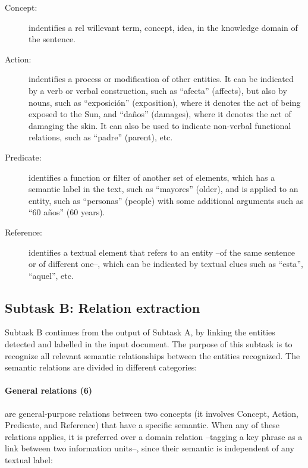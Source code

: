 \documentclass[a4paper,11pt,twocolumn,twoside]{article}
\begin{document}
\begin{description}
  \item[Concept:] indentifies a rel willevant term, concept, idea, in the knowledge domain of the sentence.
  \item[Action:] indentifies a process or modification of other entities. It can be indicated by a verb or verbal construction, such as “afecta” (affects), but also by nouns, such as “exposición” (exposition), where it denotes the act of being exposed to the Sun, and “daños” (damages), where it denotes the act of damaging the skin. It can also be used to indicate non-verbal functional relations, such as “padre” (parent), etc.
  \item[Predicate:] identifies a function or filter of another set of elements, which has a semantic label in the text, such as “mayores” (older), and is applied to an entity, such as “personas” (people) with some additional arguments such as “60 años” (60 years).
  \item[Reference:] identifies a textual element that refers to an entity –of the same sentence or of different one–, which can be indicated by textual clues such as “esta”, “aquel”, etc.
\end{description}

\subsection{Subtask B: Relation extraction}

Subtask B continues from the output of Subtask A, by linking the entities detected and labelled in the input document. The purpose of this subtask is to recognize all relevant semantic relationships between the entities recognized. The semantic relations are divided in different categories:

\paragraph{General relations (6)} are general-purpose relations between two concepts (it involves Concept, Action, Predicate, and Reference) that have a specific semantic. When any of these relations applies, it is preferred over a domain relation –tagging a key phrase as a link between two information units–, since their semantic is independent of any textual label:
\end{document}

